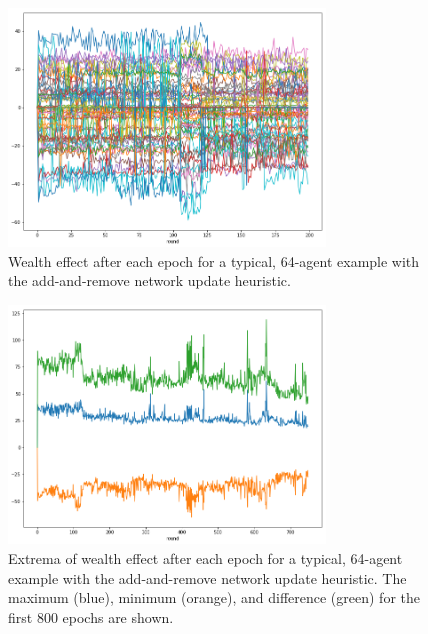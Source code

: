 \documentclass[smallextended]{svjour3}
\begin{document}
\begin{figure}
  \includegraphics[width=0.75\textwidth]{h2startwealth.png}
  \caption{Wealth effect after each epoch for a typical, 64-agent example with the add-and-remove
    network update heuristic.}
  \label{h2startwealth}
\end{figure}

\begin{figure}
  \includegraphics[width=0.75\textwidth]{h2startgap.png}
  \caption{Extrema of wealth effect after each epoch for a typical, 64-agent
    example with the add-and-remove network update heuristic. The maximum (blue),
    minimum (orange), and difference (green) for the first 800 epochs are shown.}
  \label{h2startgap}
\end{figure}
\end{document}
